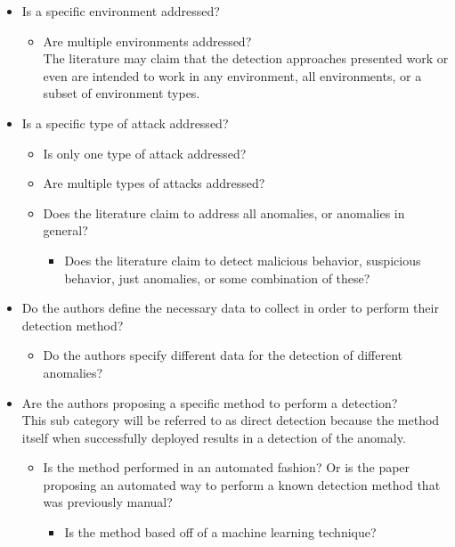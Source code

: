 \documentclass[10pt]{IEEEtran}
\begin{document}
\begin{itemize}
    \item Is a specific environment addressed?
        \begin{itemize}
            \item Are multiple environments addressed?\\
            The literature may claim that the detection approaches presented work or even are intended to work in any environment, all environments, or a subset of environment types.
        \end{itemize}
    \item Is a specific type of attack addressed?
    \begin{itemize}
        \item Is only one type of attack addressed?
        \item Are multiple types of attacks addressed?
        \item Does the literature claim to address all anomalies, or anomalies in general?
        \begin{itemize}
            \item Does the literature claim to detect malicious behavior, suspicious behavior, just anomalies, or some combination of these?
        \end{itemize}
    \end{itemize}
    \item Do the authors define the necessary data to collect in order to perform their detection method?
        \begin{itemize}
            \item Do the authors specify different data for the detection of different anomalies?
        \end{itemize}
    \item Are the authors proposing a specific method to perform a detection?\\
    This sub category will be referred to as direct detection because the method itself when successfully deployed results in a detection of the anomaly. 
        \begin{itemize}
            \item Is the method performed in an automated fashion? Or is the paper proposing an automated way to perform a known detection method that was previously manual?
            \begin{itemize}
                \item Is the method based off of a machine learning technique?

\end{itemize}
\end{itemize}
\end{itemize}
\end{document}
